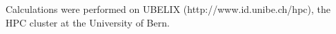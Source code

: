 \documentclass{ametsoc}
\begin{document}
Calculations were performed on UBELIX (http://www.id.unibe.ch/hpc), the HPC cluster at the University of Bern.


%






%
%
%


\end{document}

